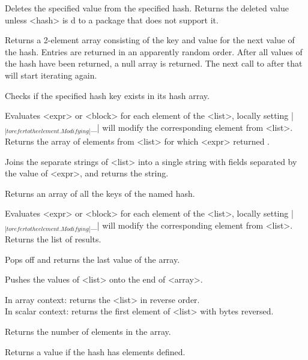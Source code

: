\documentclass{refbase}
\begin{document}
\begin{enum}{1cm}

Deletes the specified value from the specified hash.
Returns the deleted value unless <hash> is d to a package that
does not support it.

Returns a 2-element array consisting of the key and value for the next
value of the hash. Entries are returned in an apparently
random order. After all values of the hash have been returned, a null array is
returned. The next call to  after that will start iterating again.

Checks if the specified hash key exists in its hash array.

Evaluates <expr> or <block> for each element of the <list>, 
locally setting |$_|
to refer to the element. Modifying |$_| will modify the corresponding
element from <list>. Returns the array of elements from <list> for which
<expr> returned \true. 

Joins the separate strings of <list> into a single string with fields
separated by the value of <expr>, and returns the string.

Returns an array of all the keys of the named hash.

Evaluates <expr> or <block> for each element of the <list>, 
locally setting |$_|
to refer to the element. Modifying |$_| will modify the corresponding
element from <list>. Returns the list of results.

Pops off and returns the last value of the array.

Pushes the values of <list> onto the end of <array>.

In array context: returns the <list> in reverse order. \\
In scalar
context: returns the first element of <list> with bytes reversed. 

Returns the number of elements in the array.

Returns a \true{} value if the hash has elements defined.


\end{enum}
\end{document}
